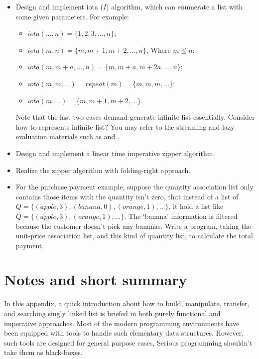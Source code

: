 \documentclass[UTF8]{article}
\begin{document}
\begin{Exercise}
\begin{itemize}
\item Design and implement iota ($I$) algorithm, which can enumerate a list with some given parameters. For example:
  \begin{itemize}
  \item $iota(..., n) = \{1, 2, 3, ..., n\}$;
  \item $iota(m, n) = \{m, m+1, m+2, ..., n\}$, Where $m \leq n$;
  \item $iota(m, m+a, ..., n) = \{m, m+a, m+2a, ..., n \}$;
  \item $iota(m, m, ...) = repeat(m) = \{m, m, m, ...\}$;
  \item $iota(m, ...) = \{m, m+1, m+2, ... \}$.
  \end{itemize}
  Note that the last two cases demand generate infinite list essentially. Consider how to represents infinite list?
  You may refer to the streaming and lazy evaluation materials such as \cite{SICP} and \cite{learn-haskell}.
\item Design and implement a linear time imperative zipper algorithm.
\item Realize the zipper algorithm with folding-right approach.
\item For the purchase payment example, suppose the quantity association list only contains those items with
the quantity isn't zero, that instead of a list of $Q = \{(apple, 3), (banana, 0), (orange, 1), ...\}$, it
hold a list like $Q = \{(apple, 3), (orange, 1), ...\}$. The `banana' information is filtered because the customer
doesn't pick any bananas. Write a program, taking the unit-price association list, and this kind of quantity
list, to calculate the total payment.
\end{itemize}
\end{Exercise}

\section{Notes and short summary}
In this appendix, a quick introduction about how to build, manipulate, transfer, and searching singly
linked list is briefed in both purely functional and imperative approaches. Most of the modern programming
environments have been equipped with tools to handle such elementary data structures. However, such tools
are designed for general purpose cases, Serious programming shouldn't take them as black-boxes.
\end{document}
